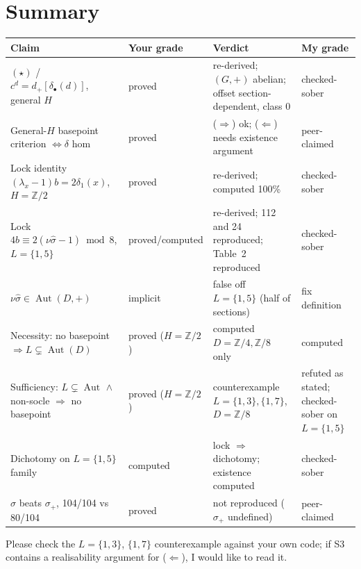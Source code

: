 \documentclass[11pt]{article}
\newcommand{\Z}{\mathbb{Z}}
\newcommand{\Aut}{\operatorname{Aut}}
\newcommand{\sh}{\hat\sigma}
\newcommand{\dplus}{d_{+}}
\begin{document}
\section*{Summary}
\begin{center}
\small
\begin{tabularx}{\textwidth}{@{}YllY@{}}
\toprule
Claim & Your grade & Verdict & My grade\\
\midrule
$(\star)$ / $c^d=\dplus[\delta_\bullet(d)]$, general $H$ & proved & re-derived; $(G,+)$ abelian; offset section-dependent, class 0 & checked-sober\\
General-$H$ basepoint criterion $\iff\delta$ hom & proved & ($\Rightarrow$) ok; ($\Leftarrow$) needs existence argument & peer-claimed\\
Lock identity $(\lambda_x-1)b=2\delta_1(x)$, $H=\Z/2$ & proved & re-derived; computed 100\% & checked-sober\\
Lock $4b\equiv2(\nu\sh-1)\bmod8$, $L=\{1,5\}$ & proved/computed & re-derived; 112 and 24 reproduced; Table~2 reproduced & checked-sober\\
$\nu\sh\in\Aut(D,+)$ & implicit & false off $L=\{1,5\}$ (half of sections) & fix definition\\
Necessity: no basepoint $\Rightarrow L\subsetneq\Aut(D)$ & proved ($H=\Z/2$) & computed $D=\Z/4,\Z/8$ only & computed\\
Sufficiency: $L\subsetneq\Aut$ $\wedge$ non-socle $\Rightarrow$ no basepoint & proved ($H=\Z/2$) & counterexample $L=\{1,3\},\{1,7\}$, $D=\Z/8$ & refuted as stated; checked-sober on $L=\{1,5\}$\\
Dichotomy on $L=\{1,5\}$ family & computed & lock $\Rightarrow$ dichotomy; existence computed & checked-sober\\
$\sh$ beats $\sigma_+$, 104/104 vs 80/104 & proved & not reproduced ($\sigma_+$ undefined) & peer-claimed\\
\bottomrule
\end{tabularx}
\end{center}

\noindent Please check the $L=\{1,3\}$, $\{1,7\}$ counterexample against your own code;
if S3 contains a realisability argument for ($\Leftarrow$), I would like to read it.
\end{document}
